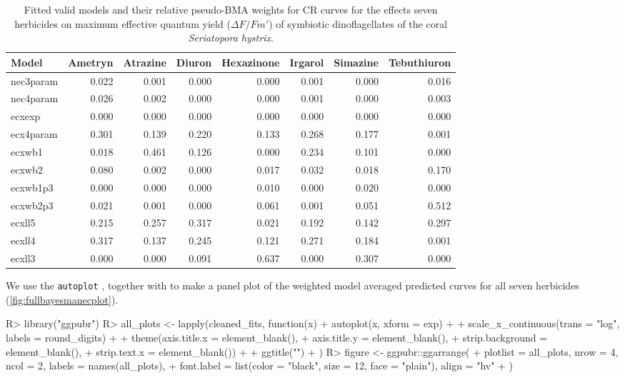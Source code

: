 \documentclass[
  shortnames]{jss}
\begin{document}
\newpage

\begin{CodeChunk}
\begin{table}

\caption{\label{tab:weightsTab}Fitted valid models and their relative pseudo-BMA weights for CR curves for the effects seven herbicides on maximum effective quantum yield ($\Delta F / Fm'$) of symbiotic dinoflagellates of the coral \textit{Seriatopora hystrix}.}
\centering
\begin{tabular}[t]{l|r|r|r|r|r|r|r}
\hline
Model & Ametryn & Atrazine & Diuron & Hexazinone & Irgarol & Simazine & Tebuthiuron\\
\hline
nec3param & 0.022 & 0.001 & 0.000 & 0.000 & 0.001 & 0.000 & 0.016\\
\hline
nec4param & 0.026 & 0.002 & 0.000 & 0.000 & 0.001 & 0.000 & 0.003\\
\hline
ecxexp & 0.000 & 0.000 & 0.000 & 0.000 & 0.000 & 0.000 & 0.000\\
\hline
ecx4param & 0.301 & 0.139 & 0.220 & 0.133 & 0.268 & 0.177 & 0.001\\
\hline
ecxwb1 & 0.018 & 0.461 & 0.126 & 0.000 & 0.234 & 0.101 & 0.000\\
\hline
ecxwb2 & 0.080 & 0.002 & 0.000 & 0.017 & 0.032 & 0.018 & 0.170\\
\hline
ecxwb1p3 & 0.000 & 0.000 & 0.000 & 0.010 & 0.000 & 0.020 & 0.000\\
\hline
ecxwb2p3 & 0.021 & 0.001 & 0.000 & 0.061 & 0.001 & 0.051 & 0.512\\
\hline
ecxll5 & 0.215 & 0.257 & 0.317 & 0.021 & 0.192 & 0.142 & 0.297\\
\hline
ecxll4 & 0.317 & 0.137 & 0.245 & 0.121 & 0.271 & 0.184 & 0.001\\
\hline
ecxll3 & 0.000 & 0.000 & 0.091 & 0.637 & 0.000 & 0.307 & 0.000\\
\hline
\end{tabular}
\end{table}

\end{CodeChunk}

We use the  \texttt{autoplot} , together with  \citep{ggpubr} to make a panel plot of the weighted model averaged predicted curves for all seven herbicides (\autoref{fig:fullbayesmanecplot}).

\begin{CodeChunk}
\begin{CodeInput}
R> library("ggpubr")
R> all_plots <- lapply(cleaned_fits, function(x) {
+   autoplot(x, xform = exp) +
+   scale_x_continuous(trans = "log", labels = round_digits) +
+   theme(axis.title.x = element_blank(),
+          axis.title.y = element_blank(),
+          strip.background = element_blank(),
+          strip.text.x = element_blank()) +
+     ggtitle("")
+ })
R> figure <- ggpubr::ggarrange(
+   plotlist = all_plots, nrow = 4, ncol = 2, labels = names(all_plots),
+   font.label = list(color = "black", size = 12, face = "plain"), align = "hv"
+ )
\end{CodeInput}
\end{CodeChunk}
\end{document}
